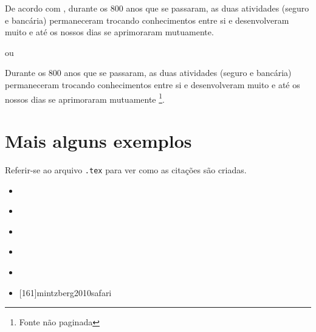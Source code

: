 De acordo com \textcite[cap. 1]{cnseg2017mercado}, durante os 800 anos que se passaram,
as duas atividades (seguro e bancária) permaneceram trocando conhecimentos entre si e
desenvolveram muito e até os nossos dias se aprimoraram mutuamente.

ou

Durante os 800 anos que se passaram, as duas atividades (seguro e bancária) permaneceram
trocando conhecimentos entre si e desenvolveram muito e até os nossos dias se aprimoraram
mutuamente \parencite[cap. 1]{cnseg2017mercado}\footnote{Fonte não paginada}.

\section{Mais alguns exemplos}

Referir-se ao arquivo \texttt{.tex} para ver como as citações são criadas.

\begin{itemize}
  \item \cite[ver:][30--42]{churchill2012marketing}
  \item \textcites[142-146]{churchill2012marketing}[21--23]{biolife2008}[45]{simon1997administrative}
  \item \cites[142-146]{churchill2012marketing}[21--23]{biolife2008}[45]{simon1997administrative}
  \item \cite{nouri2025}
  \item \cite{marginalrevolutionBordaCount}
  \item {}[161]{mintzberg2010safari}
\end{itemize}
